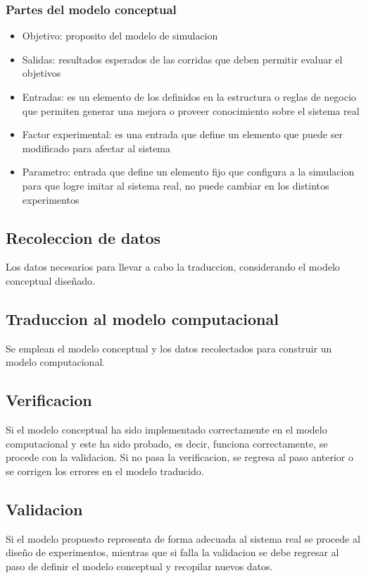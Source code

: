 \documentclass[a4paper]{article}
\begin{document}
\subsubsection*{Partes del modelo conceptual}
\begin{itemize}
    \item Objetivo: proposito del modelo de simulacion
    \item Salidas: resultados esperados de las corridas que deben permitir evaluar el objetivos
    \item Entradas: es un elemento de los definidos en la estructura o reglas de negocio que permiten
    generar una mejora o proveer conocimiento sobre el sistema real
    \item Factor experimental: es una entrada que define un elemento que puede ser modificado para afectar 
    al sistema
    \item Parametro: entrada que define un elemento fijo que configura a la simulacion para que logre imitar 
    al sistema real, no puede cambiar en los distintos experimentos
\end{itemize}




\subsection*{Recoleccion de datos}
Los datos necesarios para llevar a cabo la traduccion, considerando el modelo conceptual diseñado.

\subsection*{Traduccion al modelo computacional}
Se emplean el modelo conceptual y los datos recolectados para construir un modelo computacional.

\subsection*{Verificacion}
Si el modelo conceptual ha sido implementado correctamente en el modelo computacional y este ha sido
probado, es decir, funciona correctamente, se procede con la validacion. Si no pasa la verificacion, 
se regresa al paso anterior o se corrigen los errores en el modelo traducido.

\subsection*{Validacion}
Si el modelo propuesto representa de forma adecuada al sistema real se procede al diseño de experimentos,
mientras que si falla la validacion se debe regresar al paso de definir el modelo conceptual y recopilar 
nuevos datos.
\end{document}
